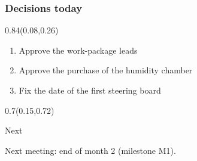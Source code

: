 \documentclass[aspectratio=169]{beamer}
\begin{document}
\begin{frame}[t]
  \frametitle{Decisions today}

\begin{textblock}{0.84}(0.08,0.26)
{\raggedright\fontsize{20}{24}\selectfont \begin{enumerate}
\item Approve the work-package leads
\item Approve the purchase of the humidity chamber
\item Fix the date of the first steering board
\end{enumerate}\par}
\end{textblock}

\begin{textblock}{0.7}(0.15,0.72)
{\begin{exampleblock}{Next}\raggedright\fontsize{15}{18}\selectfont Next meeting: end of month 2 (milestone M1).\end{exampleblock}\par}
\end{textblock}
\end{frame}
\end{document}
